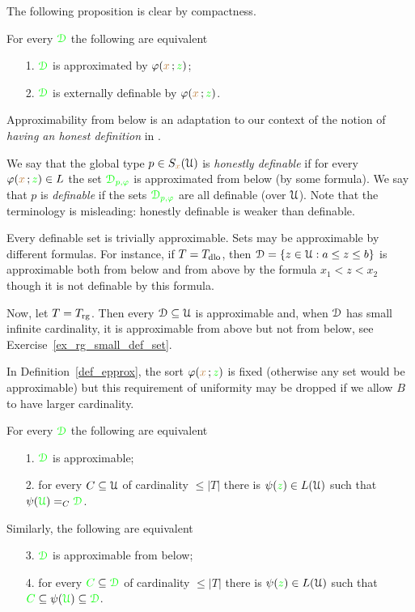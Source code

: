 \documentclass[creche.tex]{subfiles}
\begin{document}
The following proposition is clear by compactness.

\begin{proposition}\label{lem_approx=external}
For every ${\color{green}\EuScript D}$ the following are equivalent
\begin{itemize}
\item[1.] ${\color{green}\EuScript D}$ is approximated by $\varphi({\color{brown} x}\,;{\color{green} z})$;
\item[2.] ${\color{green}\EuScript D}$ is externally definable by $\varphi({\color{brown} x}\,;{\color{green} z})$.
\end{itemize}
\end{proposition}

Approximability from below is an adaptation to our context of the notion of \textit{having an honest definition} in \cite{CS}.
\begin{definition}\label{def_defble_type}
We say that the global type $p\in S_{{\color{brown} x}}(\EuScript U)$ is \emph{honestly definable\/} if for every $\varphi({\color{brown} x}\,;{\color{green} z})\in L$ the set ${\color{green}\EuScript D_{p,\varphi}}$ is approximated from below (by some formula).
We say that $p$ is \emph{definable\/} if the sets ${\color{green}\EuScript D_{p,\varphi}}$ are all definable (over $\EuScript U$).
Note that the terminology is misleading: honestly definable is weaker than definable.
\end{definition}

\begin{example}
Every definable set is trivially approximable.
Sets may be approximable by different formulas.
For instance, if $T=T_{\rm dlo}$, then $\EuScript D=\{z\in\EuScript U:a\le z\le b\}$ is approximable both from below and from above by the formula $x_1<z<x_2$ though it is not definable by this formula.

Now, let $T=T_{\rm rg}$.
Then every $\EuScript D\subseteq\EuScript U$ is approximable and, when $\EuScript D$ has small infinite cardinality, it is approximable from above but not from below, see Exercise~\ref{ex_rg_small_def_set}.\QED
\end{example}

In Definition~\ref{def_epprox}, the sort $\varphi({\color{brown} x}\,;{\color{green} z})$ is fixed (otherwise any set would be approximable) but this requirement of uniformity may be dropped if we allow $B$ to have larger cardinality.

\begin{proposition}\label{lem_approx_nonunif}
For every ${\color{green}\EuScript D}$ the following are equivalent
\begin{itemize}
\item[1.] ${\color{green}\EuScript D}$ is approximable;
\item[2.] for every $C\subseteq\EuScript U$ of cardinality $\le|T|$ there is $\psi({\color{green} z})\in L(\EuScript U)$ such that $\psi({\color{green}\EuScript U})=_C{\color{green}\EuScript D}$.
\end{itemize}
Similarly, the following are equivalent
\begin{itemize}
\item[3.] ${\color{green}\EuScript D}$ is approximable from below;
\item[4.]  for every ${\color{green} C}\subseteq{\color{green}\EuScript D}$ of cardinality $\le|T|$ there is $\psi({\color{green} z})\in L(\EuScript U)$ such that ${\color{green} C}\subseteq \psi({\color{green}\EuScript U})\subseteq{\color{green}\EuScript D}$.
\end{itemize}
\end{proposition}
\end{document}
